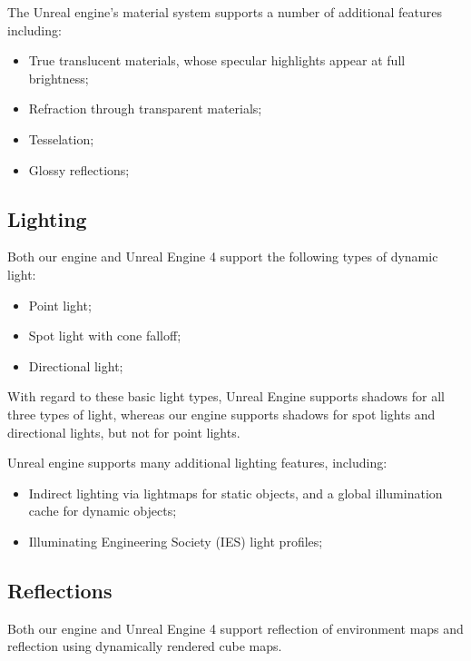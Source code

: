 \documentclass[11pt]{scrartcl} %
\begin{document}
        The Unreal engine's material system supports a number of additional
        features including:

        \begin{itemize}
            \item True translucent materials, whose specular highlights appear at full brightness;
            \item Refraction through transparent materials;
            \item Tesselation;
            \item Glossy reflections;
        \end{itemize}

    \subsection{Lighting}

        Both our engine and Unreal Engine 4 support the following types of
        dynamic light:

        \begin{itemize}
            \item Point light;
            \item Spot light with cone falloff;
            \item Directional light;
        \end{itemize}

        With regard to these basic light types, Unreal Engine supports shadows
        for all three types of light, whereas our engine supports shadows for
        spot lights and directional lights, but not for point lights.

        Unreal engine supports many additional lighting features, including:

        \begin{itemize}
            \item Indirect lighting via lightmaps for static objects, and a global illumination cache for dynamic objects;
            \item Illuminating Engineering Society (IES) light profiles;
        \end{itemize}

    \subsection{Reflections}

        Both our engine and Unreal Engine 4 support reflection of environment
        maps and reflection using dynamically rendered cube maps.
\end{document}
